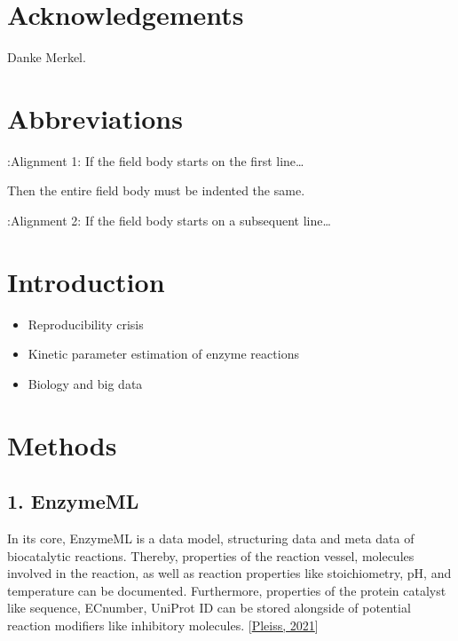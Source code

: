 \documentclass[letterpaper,10pt,english]{jupyterBook}
\begin{document}
\chapter{Acknowledgements}
\label{\detokenize{acknowledgements:acknowledgements}}\label{\detokenize{acknowledgements::doc}}
\sphinxAtStartPar
Danke Merkel.

\sphinxstepscope


\chapter{Abbreviations}
\label{\detokenize{abbreviations:abbreviations}}\label{\detokenize{abbreviations::doc}}
\sphinxAtStartPar
:Alignment 1: If the field body starts on the first line…

\begin{sphinxVerbatim}[commandchars=\\\{\}]
          Then the entire field body must be indented the same.
\end{sphinxVerbatim}

\sphinxAtStartPar
:Alignment 2:
If the field body starts on a subsequent line…

\sphinxstepscope


\chapter{Introduction}
\label{\detokenize{introduction:introduction}}\label{\detokenize{introduction::doc}}\begin{itemize}
\item {} 
\sphinxAtStartPar
Reproducibility crisis

\item {} 
\sphinxAtStartPar
Kinetic parameter estimation of enzyme reactions

\item {} 
\sphinxAtStartPar
Biology and big data

\end{itemize}

\sphinxstepscope


\chapter{Methods}
\label{\detokenize{methods:methods}}\label{\detokenize{methods::doc}}

\section{1. EnzymeML}
\label{\detokenize{methods:enzymeml}}
\sphinxAtStartPar
In its core, EnzymeML is a data model, structuring data and meta data of biocatalytic reactions. Thereby, properties of the reaction vessel, molecules involved in the reaction, as well as reaction properties like stoichiometry, pH, and temperature can be documented. Furthermore, properties of the protein catalyst like sequence, EC\sphinxhyphen{}number, UniProt ID can be stored alongside of potential reaction modifiers like inhibitory molecules. {[}\hyperlink{cite.references:id5}{Pleiss, 2021}{]}
\end{document}
